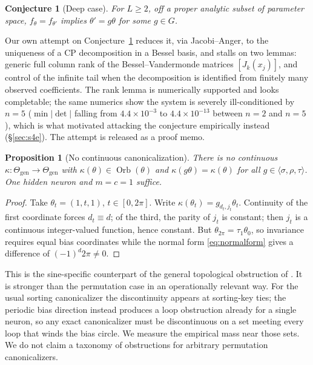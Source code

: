 \documentclass[10pt,twocolumn,letterpaper]{article}
\newtheorem{proposition}[theorem]{Proposition}
\newtheorem{conjecture}[theorem]{Conjecture}
\theoremstyle{definition}
\newcommand{\Thgen}{\Theta_{\mathrm{gen}}}
\DeclareMathOperator{\Orb}{Orb}
\begin{document}
\begin{conjecture}[Deep case]\label{conj:deep}
For $L\ge2$, off a proper analytic subset of parameter space, $f_\theta = f_{\theta'}$ implies
$\theta' = g\theta$ for some $g\in G$.
\end{conjecture}

Our own attempt on Conjecture~\ref{conj:deep} reduces it, via Jacobi--Anger, to the uniqueness of a
CP decomposition in a Bessel basis, and stalls on two lemmas: generic full column rank of the
Bessel--Vandermonde matrices $[J_k(x_j)]$, and control of the infinite tail when the decomposition
is identified from finitely many observed coefficients. The rank lemma is numerically supported and
looks completable; the same numerics show the system is severely ill-conditioned by $n=5$
($\min|\det|$ falling from $4.4\times10^{-3}$ to $4.4\times10^{-13}$ between $n=2$ and $n=5$), which
is what motivated attacking the conjecture empirically instead (\S\ref{sec:s4e}). The attempt is released as a proof memo.

\begin{proposition}[No continuous canonicalization]\label{prop:po5}
There is no continuous $\kappa : \Thgen \to \Thgen$ with $\kappa(\theta) \in \Orb(\theta)$ and
$\kappa(g\theta) = \kappa(\theta)$ for all $g \in \langle\sigma,\rho,\tau\rangle$. One hidden
neuron and $m=c=1$ suffice.
\end{proposition}

\begin{proof}
Take $\theta_t = (1,t,1)$, $t\in[0,2\pi]$. Write $\kappa(\theta_t) = g_{d_t,j_t}\theta_t$.
Continuity of the first coordinate forces $d_t \equiv d$; of the third, the parity of $j_t$ is
constant; then $j_t$ is a continuous integer-valued function, hence constant. But
$\theta_{2\pi} = \tau_1\theta_0$, so invariance requires equal bias coordinates while the normal
form \eqref{eq:normalform} gives a difference of $(-1)^d 2\pi \neq 0$.
\end{proof}

This is the sine-specific counterpart of the general topological obstruction of
\citet{dym2024impossibility}. It is stronger than the permutation case in an operationally
relevant way. For the usual sorting canonicalizer the discontinuity appears at sorting-key ties;
the periodic bias direction instead produces a loop obstruction already for a single neuron, so
any exact canonicalizer must be discontinuous on a set meeting every loop that winds the bias
circle. We measure the empirical mass near those sets. We do not claim a taxonomy of obstructions
for arbitrary permutation canonicalizers.
\end{document}
